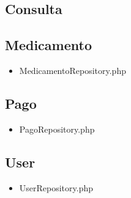		\subsection{Consulta}
		
		\subsection{Medicamento}
		\begin{itemize}
		\item MedicamentoRepository.php
		\end{itemize}
		\subsection{Pago}
		\begin{itemize}
			\item PagoRepository.php
		\end{itemize}
		\subsection{User}
		\begin{itemize}
			\item UserRepository.php
		\end{itemize}%


